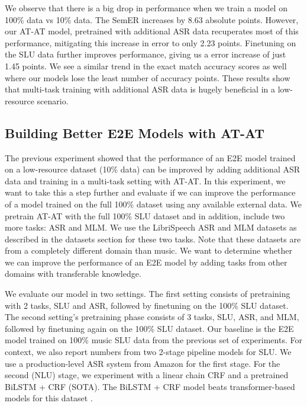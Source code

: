 \documentclass[letterpaper]{article} \usepackage{aaai21}  \usepackage{times}  \usepackage{helvet} \usepackage{courier}  \usepackage[hyphens]{url}  \usepackage{graphicx} \usepackage{booktabs}
\begin{document}
We observe that there is a big drop in performance when we train a model on 100\% data vs 10\% data. The SemER increases by 8.63 absolute points. However, our AT-AT model, pretrained with additional ASR data recuperates most of this performance, mitigating this increase in error to only 2.23 points. Finetuning on the SLU data further improves performance, giving us a error increase of just 1.45 points. We see a similar trend in the exact match accuracy scores as well where our models lose the least number of accuracy points. These results show that multi-task training with additional ASR data is hugely beneficial in a low-resource scenario.

\subsection{Building Better E2E Models with AT-AT}
The previous experiment showed that the performance of an E2E model trained on a low-resource dataset (10\% data) can be improved by adding additional ASR data and training in a multi-task setting with AT-AT. In this experiment, we want to take this a step further and evaluate if we can improve the performance of a model trained on the full 100\% dataset using any available external data. We pretrain AT-AT with the full 100\% SLU dataset and in addition, include two more tasks: ASR and MLM. We use the LibriSpeech ASR and MLM datasets as described in the datasets section for these two tasks. Note that these datasets are from a completely different domain than music. We want to determine whether we can improve the performance of an E2E model by adding tasks from other domains with transferable knowledge. 

We evaluate our model in two settings. The first setting consists of pretraining with 2 tasks, SLU and ASR, followed by finetuning on the 100\% SLU dataset. The second setting's pretraining phase consists of 3 tasks, SLU, ASR, and MLM, followed by finetuning again on the 100\% SLU dataset. Our baseline is the E2E model trained on 100\% music SLU data from the previous set of experiments. For context, we also report numbers from two 2-stage pipeline models for SLU. We use a production-level ASR system from Amazon for the first stage. For the second (NLU) stage, we experiment with a linear chain CRF and a pretrained BiLSTM + CRF (SOTA). The BiLSTM + CRF model beats transformer-based models for this dataset \cite{Rongali_2020}.
\end{document}
